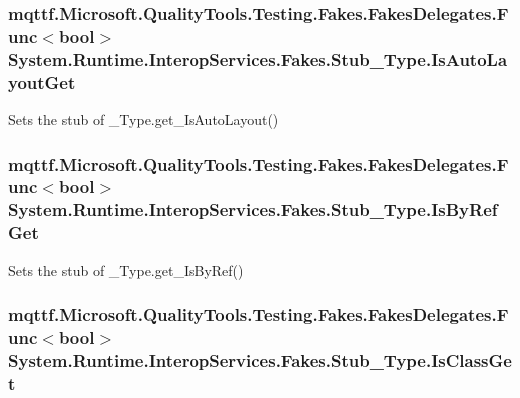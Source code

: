 \hypertarget{class_system_1_1_runtime_1_1_interop_services_1_1_fakes_1_1_stub___type_a85778e0d5f68032e285f8fbebbdde5ba}{
\subsubsection[{Is\-Auto\-Layout\-Get}]{\setlength{\rightskip}{0pt plus 5cm}mqttf.\-Microsoft.\-Quality\-Tools.\-Testing.\-Fakes.\-Fakes\-Delegates.\-Func$<$bool$>$ System.\-Runtime.\-Interop\-Services.\-Fakes.\-Stub\-\_\-\-Type.\-Is\-Auto\-Layout\-Get}}\label{class_system_1_1_runtime_1_1_interop_services_1_1_fakes_1_1_stub___type_a85778e0d5f68032e285f8fbebbdde5ba}


Sets the stub of \-\_\-\-Type.\-get\-\_\-\-Is\-Auto\-Layout()

\hypertarget{class_system_1_1_runtime_1_1_interop_services_1_1_fakes_1_1_stub___type_a7dac26ddea7067336e7ce6167f393c7c}{
\subsubsection[{Is\-By\-Ref\-Get}]{\setlength{\rightskip}{0pt plus 5cm}mqttf.\-Microsoft.\-Quality\-Tools.\-Testing.\-Fakes.\-Fakes\-Delegates.\-Func$<$bool$>$ System.\-Runtime.\-Interop\-Services.\-Fakes.\-Stub\-\_\-\-Type.\-Is\-By\-Ref\-Get}}\label{class_system_1_1_runtime_1_1_interop_services_1_1_fakes_1_1_stub___type_a7dac26ddea7067336e7ce6167f393c7c}


Sets the stub of \-\_\-\-Type.\-get\-\_\-\-Is\-By\-Ref()

\hypertarget{class_system_1_1_runtime_1_1_interop_services_1_1_fakes_1_1_stub___type_a0dc4bfb931a33744d1ce20825b4b3bef}{
\subsubsection[{Is\-Class\-Get}]{\setlength{\rightskip}{0pt plus 5cm}mqttf.\-Microsoft.\-Quality\-Tools.\-Testing.\-Fakes.\-Fakes\-Delegates.\-Func$<$bool$>$ System.\-Runtime.\-Interop\-Services.\-Fakes.\-Stub\-\_\-\-Type.\-Is\-Class\-Get}}\label{class_system_1_1_runtime_1_1_interop_services_1_1_fakes_1_1_stub___type_a0dc4bfb931a33744d1ce20825b4b3bef}


